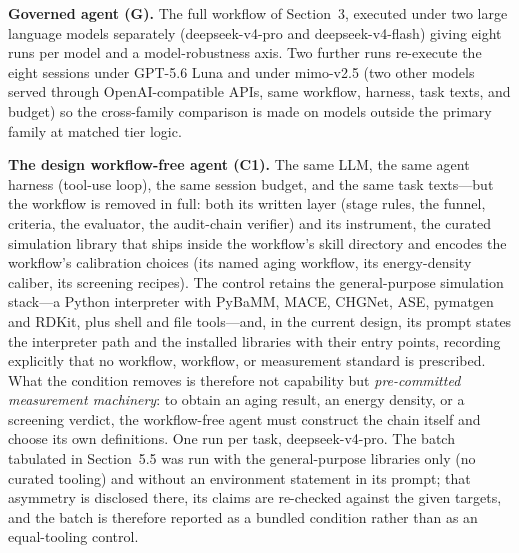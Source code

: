 \textbf{Governed agent (G).} The full workflow of Section~3, executed under
two large language models separately (deepseek-v4-pro and
deepseek-v4-flash) giving eight runs per model and a model-robustness
axis. Two further runs re-execute the eight sessions under GPT-5.6 Luna
and under mimo-v2.5 (two other models served through
OpenAI-compatible APIs, same workflow, harness, task texts, and budget) so
the cross-family comparison is made on models outside the primary family at matched
tier logic.

\textbf{The design workflow-free agent (C1).} The same LLM, the same agent harness
(tool-use loop), the same session budget, and the same task texts---but the
workflow is removed in full: both its written layer (stage rules, the funnel,
criteria, the evaluator, the audit-chain verifier) and its
instrument, the curated simulation library that ships inside the workflow's
skill directory and encodes the workflow's calibration choices (its named aging
workflow, its energy-density caliber, its screening recipes). The control
retains the general-purpose simulation stack---a Python interpreter with PyBaMM,
MACE, CHGNet, ASE, pymatgen and RDKit, plus shell and file tools---and, in the
current design, its prompt states the interpreter path and the installed
libraries with their entry points, recording explicitly that no workflow,
workflow, or measurement standard is prescribed. What the condition removes is
therefore not capability but \emph{pre-committed measurement machinery}: to
obtain an aging result, an energy density, or a screening verdict, the
workflow-free agent must construct the chain itself and choose its own
definitions. One run per task, deepseek-v4-pro. The batch tabulated in
Section~5.5 was run with the general-purpose libraries only (no curated
tooling) and without an environment statement in its prompt; that asymmetry is
disclosed there, its claims are re-checked against the given targets, and
the batch is therefore reported as a bundled condition rather than as an
equal-tooling control.

